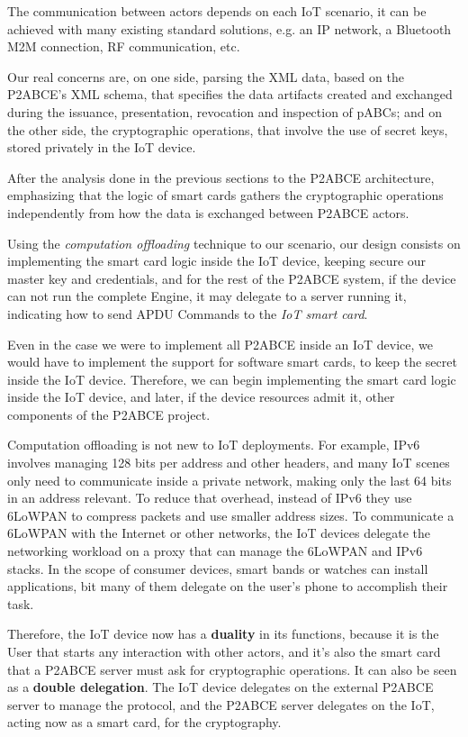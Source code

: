 \documentclass[journal]{IEEEtran}
\begin{document}
The communication between actors depends on each IoT scenario, it can be achieved with many existing standard solutions, e.g. an IP network, a Bluetooth M2M connection, RF communication, etc.

Our real concerns are, on one side, parsing the XML data, based on the P2ABCE's XML schema, that specifies the data artifacts created and exchanged during the issuance, presentation, revocation and inspection of pABCs; and on the other side, the cryptographic operations, that involve the use of secret keys, stored privately in the IoT device.

After the analysis done in the previous sections to the P2ABCE architecture, emphasizing that the logic of smart cards gathers the cryptographic operations independently from how the data is exchanged between P2ABCE actors. 

Using the \textit{computation offloading} technique to our scenario, our design consists on implementing the smart card logic inside the IoT device, keeping secure our master key and credentials, and for the rest of the P2ABCE system, if the device can not run the complete Engine, it may delegate to a server running it, indicating how to send APDU Commands to the \textit{IoT smart card}.

Even in the case we were to implement all P2ABCE inside an IoT device, we would have to implement the support for software smart cards, to keep the secret inside the IoT device. Therefore, we can begin implementing the smart card logic inside the IoT device, and later, if the device resources admit it, other components of the P2ABCE project.


\hfil

Computation offloading is not new to IoT deployments. For example, IPv6 involves managing 128 bits per address and other headers, and many IoT scenes only need to communicate inside a private network, making only the last 64 bits in an address relevant. To reduce that overhead, instead of IPv6 they use 6LoWPAN to compress packets and use smaller address sizes. To communicate a 6LoWPAN with the Internet or other networks, the IoT devices delegate the networking workload on a proxy that can manage the 6LoWPAN and IPv6 stacks. In the scope of consumer devices, smart bands or watches can install applications, bit many of them delegate on the user's phone to accomplish their task.

Therefore, the IoT device now has a \textbf{duality} in its functions, because it is the User that starts any interaction with other actors, and it's also the smart card that a P2ABCE server must ask for cryptographic operations. It can also be seen as a \textbf{double delegation}. The IoT device delegates on the external P2ABCE server to manage the protocol, and the P2ABCE server delegates on the IoT, acting now as a smart card, for the cryptography.
\end{document}
